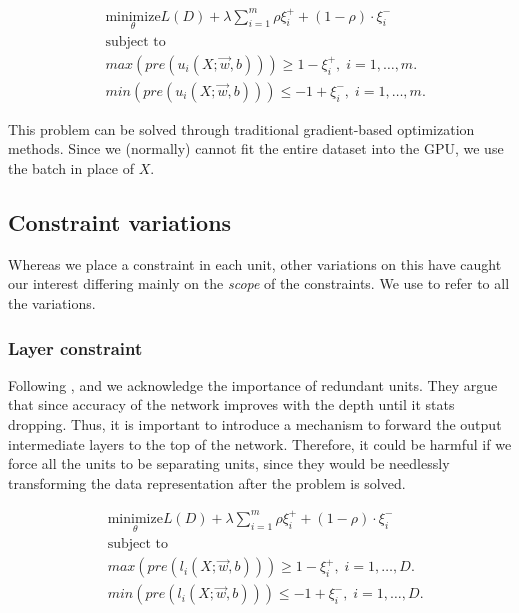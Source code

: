 \begin{equation}\label{eq:separatingUnit}
\begin{aligned}
&\underset{\theta}{\text{minimize}}   L(D) + \lambda\sum^m_{i=1} \rho \xi^+_i+(1-\rho) \cdot \xi^-_i\\
& \text{subject to}\\
&  max(pre(u_i(X;\vec{w},b))) \geq 1 - \xi^+_i, \; i = 1, \ldots, m.\\
&  min(pre(u_i(X;\vec{w},b)))\leq -1 + \xi^-_i, \; i = 1, \ldots, m.
\end{aligned}
\end{equation}

This problem can be solved through traditional gradient-based optimization methods. Since we (normally) cannot fit the entire dataset into the GPU, we use the batch in place of $X$.


\subsection{Constraint variations}

Whereas we place a constraint in each unit, other variations on this have caught our interest differing mainly on the \emph{scope} of the constraints. We use \SepConstraint to refer to all the variations.

\subsubsection{Layer constraint}

Following \cite{resnet}, \cite{densenet} and \cite{simpnet} we acknowledge the importance of redundant units. They argue that since accuracy of the network improves with the depth until it stats dropping. Thus, it is important to introduce a mechanism to forward the output intermediate layers to the top of the network. Therefore, it could be harmful if we force all the units to be separating units, since they would be needlessly transforming the data representation after the problem is solved.

\begin{equation}\label{eq:separatingLayer}
\begin{aligned}
&\underset{\theta}{\text{minimize}}   L(D) + \lambda\sum^m_{i=1} \rho \xi^+_i+(1-\rho) \cdot \xi^-_i\\
& \text{subject to}\\
&  max(pre(l_i(X;\vec{w},b))) \geq 1 - \xi^+_i, \; i = 1, \ldots, D.\\
&  min(pre(l_i(X;\vec{w},b)))\leq -1 + \xi^-_i, \; i = 1, \ldots, D.
\end{aligned}
\end{equation}

